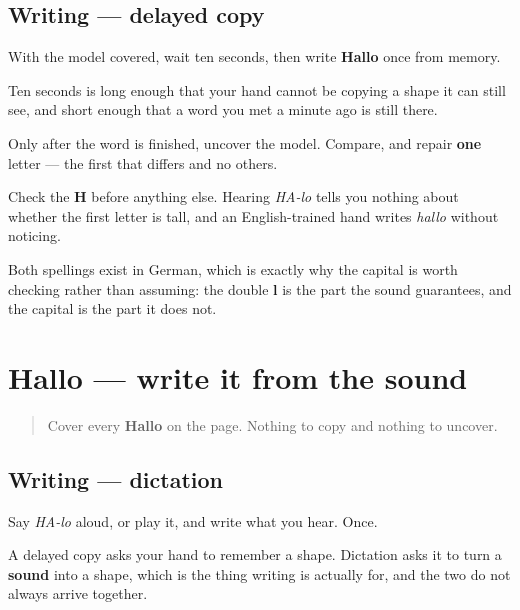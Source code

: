 \subsection*{Writing — delayed copy}

With the model covered, wait ten seconds, then write \textbf{Hallo} once from memory.

Ten seconds is long enough that your hand cannot be copying a shape it can still see, and short enough that a word you met a minute ago is still there.

Only after the word is finished, uncover the model. Compare, and repair \textbf{one} letter — the first that differs and no others.

\begin{tcolorbox}[breakable,colback=teal!4,colframe=teal!35!black,title={Before you move on}]
Check the \textbf{H} before anything else. Hearing \emph{HA-lo} tells you nothing about whether the first letter is tall, and an English-trained hand writes \emph{hallo} without noticing.

Both spellings exist in German, which is exactly why the capital is worth checking rather than assuming: the double \textbf{l} is the part the sound guarantees, and the capital is the part it does not.
\end{tcolorbox}
\section[Hallo]{Hallo — write it from the sound}

\label{lesson:GE-W01-hallo-dictation}



\begin{quote}
Cover every \textbf{Hallo} on the page. Nothing to copy and nothing to uncover.
\end{quote}

\subsection*{Writing — dictation}
Say \emph{HA-lo} aloud, or play it, and write what you hear. Once.

A delayed copy asks your hand to remember a shape. Dictation asks it to turn a \textbf{sound} into a shape, which is the thing writing is actually for, and the two do not always arrive together.

